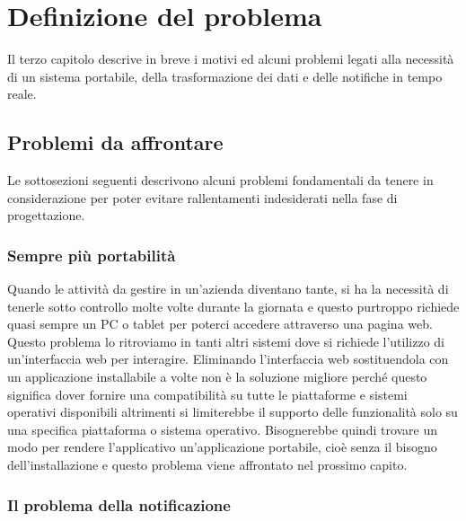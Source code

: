 
\chapter{Definizione del problema}
\label{cap:definizione-problema}

Il terzo capitolo descrive in breve i motivi ed alcuni problemi legati alla necessità di un sistema portabile, della trasformazione dei dati e delle notifiche in tempo reale.\\



\section{Problemi da affrontare}
Le sottosezioni seguenti descrivono alcuni problemi fondamentali da tenere in considerazione per poter evitare rallentamenti indesiderati nella fase di progettazione.

\subsection{Sempre più portabilità}
Quando le attività da gestire in un'azienda diventano tante, si ha la necessità di tenerle sotto controllo molte volte durante la giornata e questo purtroppo richiede quasi sempre un PC o tablet per poterci accedere attraverso una pagina web. Questo problema lo ritroviamo in tanti altri sistemi dove si richiede l'utilizzo di un'interfaccia web per interagire. Eliminando l'interfaccia web sostituendola con un applicazione installabile a volte non è la soluzione migliore perché questo significa dover fornire una compatibilità su tutte le piattaforme e sistemi operativi disponibili altrimenti si  limiterebbe il supporto delle funzionalità solo su una specifica piattaforma o sistema operativo. Bisognerebbe quindi trovare un modo per rendere l'applicativo un'applicazione portabile, cioè senza il bisogno dell'installazione e questo problema viene affrontato nel prossimo capito.

\subsection{Il problema della notificazione}

